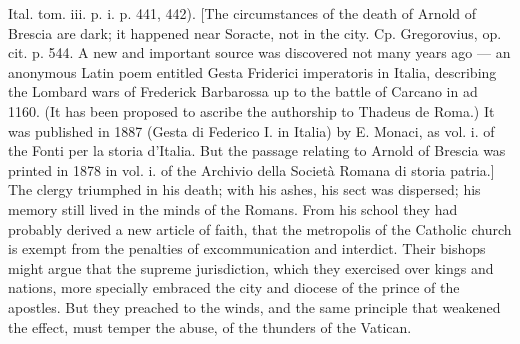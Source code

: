{Ital. tom. iii. p. i. p. 441, 442). [The circumstances of the death of Arnold of Brescia are dark; it happened near Soracte, not in the city. Cp. Gregorovius, op. cit. p. 544. A new and important source was discovered not many years ago \texthebrew{—} an anonymous Latin poem entitled Gesta Friderici imperatoris in Italia, describing the Lombard wars of Frederick Barbarossa up to the battle of Carcano in ad 1160. (It has been proposed to ascribe the authorship to Thadeus de Roma.) It was published in 1887 (Gesta di Federico I. in Italia) by E. Monaci, as vol. i. of the Fonti per la storia d\texthebrew{}’Italia. But the passage relating to Arnold of Brescia was printed in 1878 in vol. i. of the Archivio della Società Romana di storia patria.]} The clergy triumphed in his death; with his ashes, his sect was dispersed; his memory still lived in the minds of the Romans. From his school they had probably derived a new article of faith, that the metropolis of the Catholic church is exempt from the penalties of excommunication and interdict. Their bishops might argue that the supreme jurisdiction, which they exercised over kings and nations, more specially embraced the city and diocese of the prince of the apostles. But they preached to the winds, and the same principle that weakened the effect, must temper the abuse, of the thunders of the Vatican.

